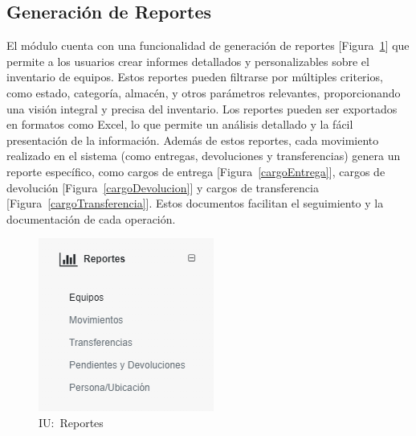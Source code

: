 \documentclass[stu, 12pt, letterpaper, donotrepeattitle, floatsintext, natbib]{apa7}
\begin{document}
\subsection{Generación de Reportes}
El módulo cuenta con una funcionalidad de generación de reportes [Figura~\ref{reportes}] que permite a los usuarios crear informes detallados
y personalizables sobre el inventario de equipos. Estos reportes pueden filtrarse por múltiples criterios, como estado, categoría, almacén, y
otros parámetros relevantes, proporcionando una visión integral y precisa del inventario. Los reportes pueden ser exportados en formatos como
Excel, lo que permite un análisis detallado y la fácil presentación de la información. Además de estos reportes, cada movimiento realizado en
el sistema (como entregas, devoluciones y transferencias) genera un reporte específico, como cargos de entrega [Figura~\ref{cargoEntrega}],
cargos de devolución [Figura~\ref{cargoDevolucion}] y cargos de transferencia [Figura~\ref{cargoTransferencia}]. Estos documentos facilitan el
seguimiento y la documentación de cada operación.
\begin{figure}[H]
    \centering
    \caption{IU:~Reportes}\label{reportes}
    \includegraphics[scale=1]{./images/reportes.png}
\end{figure}
\end{document}
